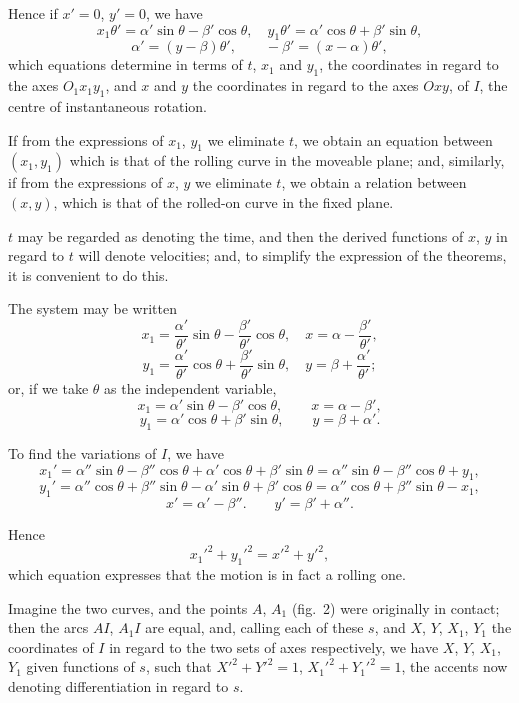 \documentclass[12pt,a4paper]{article}
\theoremstyle{plain}
\begin{document}
Hence if $x'=0$, $y'=0$, we have
\[
x_1\theta' = \alpha'\sin\theta - \beta'\cos\theta,\quad
y_1\theta' = \alpha'\cos\theta + \beta'\sin\theta,
\]
\[
\alpha' = (y-\beta)\theta',\qquad -\beta' = (x-\alpha)\theta',
\]
which equations determine in terms of $t$, $x_1$ and $y_1$, the coordinates
in regard to the axes $O_1x_1y_1$, and $x$ and $y$ the coordinates in regard
to the axes $Oxy$, of $I$, the centre of instantaneous rotation.

If from the expressions of $x_1$, $y_1$ we eliminate $t$, we obtain an equation
between $(x_1,y_1)$ which is that of the rolling curve in the moveable plane;
and, similarly, if from the expressions of $x$, $y$ we eliminate $t$, we obtain
a relation between $(x,y)$, which is that of the rolled-on curve in the fixed
plane.

$t$ may be regarded as denoting the time, and then the derived functions
of $x$, $y$ in regard to $t$ will denote velocities; and, to simplify the
expression of the theorems, it is convenient to do this.

The system may be written
\[
x_1 = \frac{\alpha'}{\theta'}\sin\theta - \frac{\beta'}{\theta'}\cos\theta,
\quad x = \alpha - \frac{\beta'}{\theta'},
\]
\[
y_1 = \frac{\alpha'}{\theta'}\cos\theta + \frac{\beta'}{\theta'}\sin\theta,
\quad y = \beta + \frac{\alpha'}{\theta'};
\]
or, if we take $\theta$ as the independent variable,
\[
x_1 = \alpha'\sin\theta - \beta'\cos\theta,\qquad
x = \alpha - \beta',
\]
\[
y_1 = \alpha'\cos\theta + \beta'\sin\theta,\qquad
y = \beta + \alpha'.
\]

To find the variations of $I$, we have
\[
x_1' = \alpha''\sin\theta - \beta''\cos\theta + \alpha'\cos\theta + \beta'\sin\theta
= \alpha''\sin\theta - \beta''\cos\theta + y_1,
\]
\[
y_1' = \alpha''\cos\theta + \beta''\sin\theta - \alpha'\sin\theta + \beta'\cos\theta
= \alpha''\cos\theta + \beta''\sin\theta - x_1,
\]
\[
x' = \alpha' - \beta''.\qquad y' = \beta' + \alpha''.
\]

Hence
\[
x_1'^2 + y_1'^2 = x'^2 + y'^2,
\]
which equation expresses that the motion is in fact a rolling one.

Imagine the two curves, and the points $A$, $A_1$ (fig.~2) were originally
in contact; then the arcs $AI$, $A_1I$ are equal, and, calling each of these
$s$, and $X$, $Y$, $X_1$, $Y_1$ the coordinates of $I$ in regard to the two sets
of axes respectively, we have $X$, $Y$, $X_1$, $Y_1$ given functions of $s$,
such that $X'^2+Y'^2=1$, $X_1'^2+Y_1'^2=1$, the accents now denoting
differentiation in regard to $s$.
\end{document}

